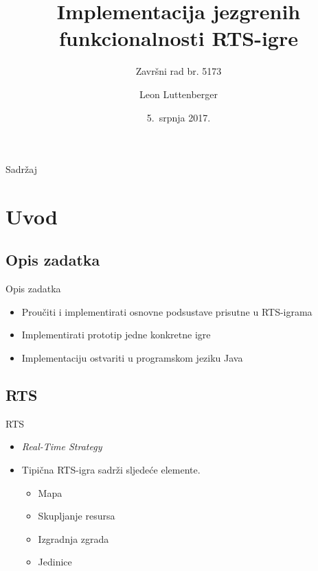 \documentclass[utf8]{beamer}
\title[Implementacija RTS igre]{Implementacija jezgrenih funkcionalnosti RTS-igre}
\subtitle{Završni rad br. 5173}
\author{Leon Luttenberger}
\institute[FER]
{
    Fakultet elektrotehnike i računarstva\\
    Sveučilište u Zagrebu
}
\date{5.~srpnja 2017.}
\begin{document}
\begin{frame}
    \titlepage
\end{frame}

\begin{frame}{Sadržaj}
    \tableofcontents
\end{frame}

\section{Uvod}

\subsection{Opis zadatka}

\begin{frame}{Opis zadatka}{}
    \begin{itemize}
        \item {
            Proučiti i implementirati osnovne podsustave prisutne u RTS-igrama
        }
        \item {
            Implementirati prototip jedne konkretne igre
        }
        \item {
            Implementaciju ostvariti u programskom jeziku Java
        }
    \end{itemize}
\end{frame}

\subsection{RTS}

\begin{frame}{RTS}
    \begin{itemize}
        \item {
            \textit{Real-Time Strategy}
        }
        \item {   
            Tipična RTS-igra sadrži sljedeće elemente.
            \begin{itemize}
                \item Mapa
                \item Skupljanje resursa
                \item Izgradnja zgrada
                \item Jedinice
            \end{itemize}
        }
    \end{itemize}
\end{frame}
\end{document}
